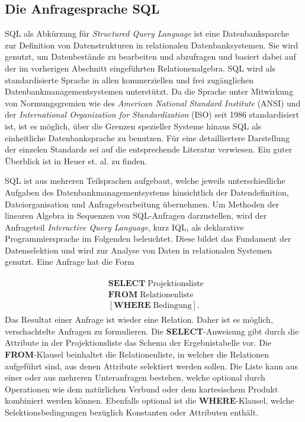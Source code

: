 \subsection{Die Anfragesprache SQL}
\label{abs:SQL_intro}
SQL als Abkürzung für \textit{Structured Query Language} ist eine Datenbanksparche zur Definition von Datenstrukturen in relationalen Datenbanksystemen. Sie wird genutzt, um Datenbestände zu bearbeiten und abzufragen und basiert dabei auf der im vorherigen Abschnitt eingeführten Relationenalgebra. SQL wird als standardisierte Sprache in allen kommerziellen und frei zugänglichen Datenbankmanagementsystemen unterstützt. Da die Sprache unter Mitwirkung von Normungsgremien wie des \textit{American National Standard Institute} (ANSI) und der \textit{International Organization for Standardization} (ISO) seit 1986 standardisiert ist, ist es möglich, über die Grenzen spezieller Systeme hinaus SQL als einheitliche Datenbanksprache zu benutzen. Für eine detailliertere Darstellung der einzelen Standards sei auf die entsprechende Literatur verwiesen. Ein guter Überblick ist in Heuer et. al.\cite{DBLP:books/daglib/0044627} zu finden.

SQL ist aus mehreren Teilsprachen aufgebaut, welche jeweils unterschiedliche Aufgaben des Datenbankmanagementsystems hinsichtlich der Datendefinition, Dateiorganisation und Anfragebearbeitung übernehmen. Um Methoden der linearen Algebra in Sequenzen von SQL-Anfragen darzustellen, wird der Anfrageteil \textit{Interactive Query Language}, kurz IQL, als deklarative Programmiersprache im Folgenden beleuchtet. Diese bildet das Fundament der Datenselektion und wird zur Analyse von Daten in relationalen Systemen genutzt. Eine Anfrage hat die Form 

\begin{align}
    \label{anf:stand}
    \begin{split}
    & \mathbf{SELECT} \; \text{Projektionsliste }\\
    & \mathbf{FROM} \; \text{Relationenliste } \\
    & [\mathbf{WHERE} \; \text{Bedingung}].
\end{split}
\end{align}
Das Resultat einer Anfrage ist wieder eine Relation. Daher ist es möglich, verschachtelte Anfragen zu formulieren. Die \textbf{SELECT}-Anweisung gibt durch die Attribute in der Projektionsliste das Schema der Ergebnistabelle vor. Die \textbf{FROM}-Klausel beinhaltet die Relationenliste, in welcher die Relationen aufgeführt sind, aus denen Attribute selektiert werden sollen. Die Liste kann aus einer oder aus mehreren Unteranfragen bestehen, welche optional durch Operationen wie dem natürlichen Verbund oder dem kartesischem Produkt kombiniert werden können. Ebenfalls optional ist die \textbf{WHERE}-Klausel, welche Selektionsbedingungen bezüglich Konstanten oder Attributen enthält. 

